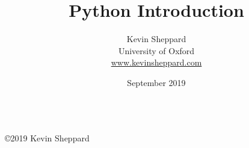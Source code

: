 \documentclass[11pt]{book}
\title{Python Introduction}
\author{Kevin Sheppard\\
University of Oxford\\
\href{https://www.kevinsheppard.com}{www.kevinsheppard.com}}
\date{September 2019}
\renewcommand{\chaptername}{Lesson}
\begin{document}
\maketitle
\begin{tabular}{c}
\tabularnewline
\end{tabular}

\thispagestyle{empty}

\vfill{}

\begin{center}
\textsf{\footnotesize{}©}2019 Kevin Sheppard
\par\end{center}

\thispagestyle{empty}\tableofcontents{}\thispagestyle{empty}
\frontmatter

\mainmatter



















\renewcommand{\chaptername}{}

\end{document}
